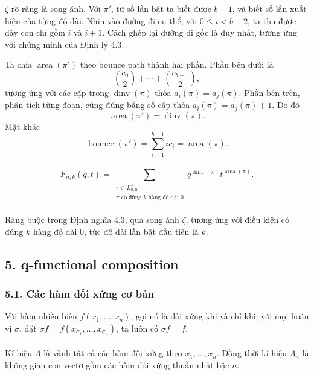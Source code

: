 \documentclass[11pt]{article}
\begin{document}

\(\zeta\) rõ ràng là song ánh. Với \(\pi'\), từ số lần bật ta biết được
\(b-1\), và biết số lần xuất hiện của từng độ dài. Nhìn vào đường đi cụ thể,
với \(0\le i<b-2\), ta thu được dãy con chỉ gồm \(i\) và \(i+1\). Cách ghép
lại đường đi gốc là duy nhất, tương ứng với chứng minh của Định lý 4.3.

Ta chia \(\operatorname{area}(\pi')\) theo bounce path thành hai phần. Phần
bên dưới là
\[
  \binom{c_0}{2}+\cdots+\binom{c_{b-1}}{2},
\]
tương ứng với các cặp trong \(\operatorname{dinv}(\pi)\) thỏa
\(a_i(\pi)=a_j(\pi)\). Phần bên trên, phân tích từng đoạn, cũng đúng bằng số
cặp thỏa \(a_i(\pi)=a_j(\pi)+1\). Do đó
\[
  \operatorname{area}(\pi')=\operatorname{dinv}(\pi).
\]
Mặt khác
\[
  \operatorname{bounce}(\pi')=\sum_{i=1}^{b-1}ic_i=\operatorname{area}(\pi).
\]


\paragraph{}
\[
  F_{n,k}(q,t)=
  \sum_{\substack{\pi\in L^+_{n,n}\\ \pi\text{ có đúng }k\text{ hàng độ dài }0}}
  q^{\operatorname{dinv}(\pi)}t^{\operatorname{area}(\pi)}.
\]

\paragraph{}
Ràng buộc trong Định nghĩa 4.3, qua song ánh \(\zeta\), tương ứng với điều kiện
có đúng \(k\) hàng độ dài \(0\), tức độ dài lần bật đầu tiên là \(k\).

\subsection*{5. q-functional composition}

\subsubsection*{5.1. Các hàm đối xứng cơ bản}

Với hàm nhiều biến \(f(x_1,\ldots,x_n)\), gọi nó là đối xứng khi và chỉ khi:
với mọi hoán vị \(\sigma\), đặt
\(\sigma f=f(x_{\sigma_1},\ldots,x_{\sigma_n})\), ta luôn có \(\sigma f=f\).

\paragraph{}
Kí hiệu \(\Lambda\) là vành tất cả các hàm đối xứng theo
\(x_1,\ldots,x_n\). Đồng thời kí hiệu \(\Lambda_n\) là không gian con vectơ
gồm các hàm đối xứng thuần nhất bậc \(n\).
\end{document}
